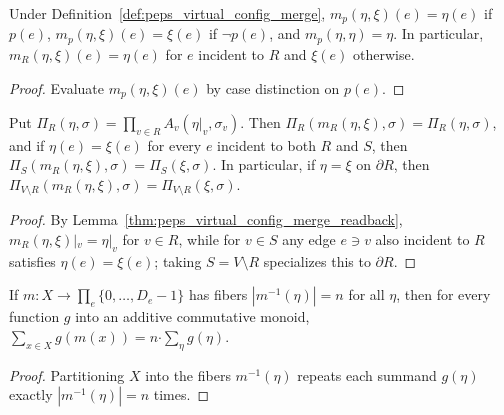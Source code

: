 \begin{lemma}
    \label{thm:peps_virtual_config_merge_readback}
    \leanok
    Under Definition~\ref{def:peps_virtual_config_merge},
    $m_p(\eta,\xi)(e)=\eta(e)$ if $p(e)$, $m_p(\eta,\xi)(e)=\xi(e)$ if
    $\neg p(e)$, and $m_p(\eta,\eta)=\eta$. In particular,
    $m_R(\eta,\xi)(e)=\eta(e)$ for $e$ incident to $R$ and $\xi(e)$ otherwise.
\end{lemma}
\begin{proof}\leanok
    Evaluate $m_p(\eta,\xi)(e)$ by case distinction on $p(e)$.
\end{proof}

\begin{lemma}
    \label{thm:peps_region_merge_products}
    \leanok
    Put $\Pi_R(\eta,\sigma)=\prod_{v\in R}A_v(\eta|_v,\sigma_v)$. Then
    $\Pi_R(m_R(\eta,\xi),\sigma)=\Pi_R(\eta,\sigma)$, and if $\eta(e)=\xi(e)$
    for every $e$ incident to both $R$ and $S$, then
    $\Pi_S(m_R(\eta,\xi),\sigma)=\Pi_S(\xi,\sigma)$. In particular, if
    $\eta=\xi$ on $\partial R$, then
    $\Pi_{V\setminus R}(m_R(\eta,\xi),\sigma)=\Pi_{V\setminus R}(\xi,\sigma)$.
\end{lemma}
\begin{proof}\leanok
    By Lemma~\ref{thm:peps_virtual_config_merge_readback},
    $m_R(\eta,\xi)|_v=\eta|_v$ for $v\in R$, while for $v\in S$ any edge $e\ni v$
    also incident to $R$ satisfies $\eta(e)=\xi(e)$; taking $S=V\setminus R$
    specializes this to $\partial R$.
\end{proof}

\begin{lemma}
    \label{thm:peps_config_fiber_sum}
    \leanok
    If $m:X\to\prod_e\{0,\ldots,D_e-1\}$ has fibers $|m^{-1}(\eta)|=n$ for all
    $\eta$, then for every function $g$ into an additive commutative monoid,
    $\sum_{x\in X} g(m(x))=n\mathbin{\boldsymbol{\cdot}}\sum_{\eta}g(\eta)$.
\end{lemma}
\begin{proof}\leanok
    Partitioning $X$ into the fibers $m^{-1}(\eta)$ repeats each summand
    $g(\eta)$ exactly $|m^{-1}(\eta)|=n$ times.
\end{proof}

